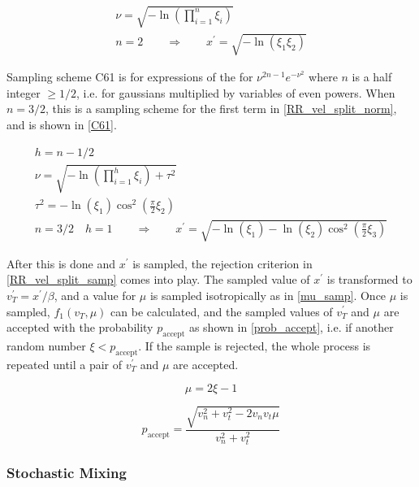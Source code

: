 \begin{equation}
\label{C49}
\begin{gathered}
\nu = \sqrt{- \ln \left( \prod_{i=1}^n \xi_i \right)} \\ 
n = 2 \qquad \Rightarrow \qquad x^\prime = \sqrt{- \ln \left( \xi_1 \xi_2 \right)}
\end{gathered}
\end{equation}

Sampling scheme C61 is for expressions of the for $\nu^{2n-1}e^{-\nu^2}$ where $n$ is a half integer $\ge 1/2$, i.e. for gaussians multiplied by variables of even powers.  When $n=3/2$, this is a sampling scheme for the first term in \eqref{RR_vel_split_norm}, and is shown in \eqref{C61}.

\begin{equation}
\label{C61}
\begin{gathered}
h = n-1/2 \\
\nu = \sqrt{- \ln \left( \prod_{i=1}^h \xi_i  \right)+ \tau^2} \\ 
\tau^2 = -\ln(\xi_1) \cos^2(\frac{\pi}{2}\xi_2)\\
n = 3/2 \quad h=1 \qquad \Rightarrow \qquad x^\prime =   \sqrt{- \ln( \xi_1) - \ln(\xi_2) \cos^2(\frac{\pi}{2}\xi_3)}
\end{gathered}
\end{equation}

After this is done and $x^\prime$ is sampled, the rejection criterion in \eqref{RR_vel_split_samp} comes into play.  The sampled value of $x^\prime$ is transformed to $v_T^\prime=x^\prime/\beta$, and a value for $\mu$ is sampled isotropically as in \eqref{mu_samp}.  Once $\mu$ is sampled, $f_1(v_T,\mu)$ can be calculated, and the sampled values of $v_T^\prime$ and $\mu$ are accepted with the probability $p_\mathrm{accept}$ as shown in \eqref{prob_accept}, i.e. if another random number $\xi<p_\mathrm{accept}$.  If the sample is rejected, the whole process is repeated until a pair of $v_T^\prime$ and $\mu$ are accepted.

\begin{equation}
\label{mu_samp}
\mu = 2\xi - 1 
\end{equation}

\begin{equation}
\label{prob_accept}
p_\mathrm{accept} = \frac{\sqrt{v_n^2+v_t^2-2 v_n v_t \mu}}{v_n^2+v_t^2}
\end{equation}

\subsubsection{Stochastic Mixing}

